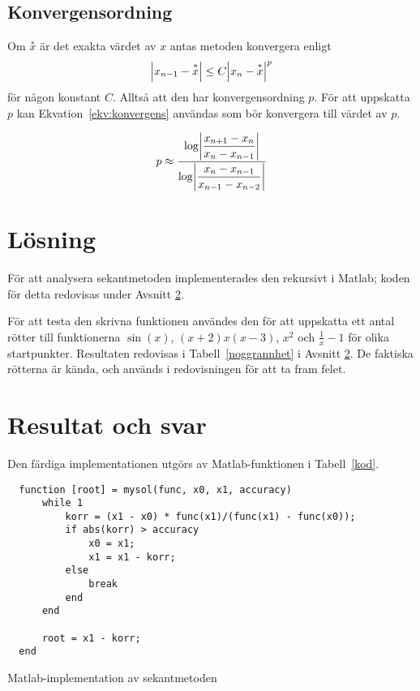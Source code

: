 \documentclass[12pt]{article}
\DeclarePairedDelimiter\abs{\lvert}{\rvert}
\begin{document}
\subsection{Konvergensordning}
Om $\overset{*}{x}$ är det exakta värdet av $x$ antas metoden konvergera enligt 
\[
  \abs*{x_{n-1}-\overset{*}{x}}\leq C\abs*{x_n-\overset{*}{x}}^p
\]
för någon konstant $C$. Alltså att den har konvergensordning $p$. För att uppskatta $p$ kan Ekvation~\ref{ekv:konvergens} användas som bör konvergera till värdet av $p$.

\begin{equation}
  p\approx\dfrac{\log\abs*{\dfrac{x_{n+1}-x_n}{x_n-x_{n-1}}}}{\log\abs*{\dfrac{x_n-x_{n-1}}{x_{n-1}-x_{n-2}}}}
\label{ekv:konvergens}
\end{equation}

\section{Lösning}
För att analysera sekantmetoden implementerades den rekursivt i Matlab; koden för detta redovisas under Avsnitt \ref{resultat}. 

För att testa den skrivna funktionen användes den för att uppskatta ett antal rötter till funktionerna $\sin(x)$, $ (x+2) x (x-3)$, $x^2$ och $\frac{1}{x} - 1$ för olika startpunkter. Resultaten redovisas i Tabell~\ref{noggrannhet} i Avsnitt \ref{resultat}. De faktiska rötterna är kända, och används i redovisningen för att ta fram felet. 

\section{Resultat och svar} \label{resultat}
Den färdiga implementationen utgörs av Matlab-funktionen i Tabell~\ref{kod}.
\begin{table}[H]
  \begin{lstlisting}
  function [root] = mysol(func, x0, x1, accuracy)
      while 1
          korr = (x1 - x0) * func(x1)/(func(x1) - func(x0));
          if abs(korr) > accuracy
              x0 = x1;
              x1 = x1 - korr;
          else
              break
          end
      end

      root = x1 - korr;
  end
  \end{lstlisting}
  \caption{Matlab-implementation av sekantmetoden}\label{kod}
\end{table}
\end{document}
